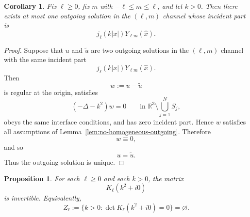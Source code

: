 \documentclass[a4paper,11pt]{article}
\numberwithin{equation}{section}
\newcommand{\R}{\mathbb{R}}
\newcommand{\jj}[1]{j_{#1}}
\newtheorem{cor}[thm]{Corollary}
\newtheorem{prop}[thm]{Proposition}
\theoremstyle{definition}
\theoremstyle{remark}
\begin{document}
\begin{cor}
\label{cor:partial-wave-uniqueness}
Fix $\ell\ge0$, fix $m$ with $-\ell\le m\le\ell$, and let $k>0$.
Then there exists at most one outgoing solution in the $(\ell,m)$ channel
whose incident part is
\[
\jj{\ell}(k|x|)Y_{\ell m}(\widehat x).
\]
\end{cor}

\begin{proof}
Suppose that $u$ and $\widetilde u$ are two outgoing solutions in the
$(\ell,m)$ channel with the same incident part
\[
\jj{\ell}(k|x|)Y_{\ell m}(\widehat x).
\]
Then
\[
w:=u-\widetilde u
\]
is regular at the origin, satisfies
\[
(-\Delta-k^2)w=0
\qquad \text{in }\R^3\setminus\bigcup_{j=1}^N S_j,
\]
obeys the same interface conditions, and has zero incident part.
Hence $w$ satisfies all assumptions of
Lemma~\ref{lem:no-homogeneous-outgoing}. Therefore
\[
w\equiv0,
\]
and so
\[
u=\widetilde u.
\]
Thus the outgoing solution is unique.
\end{proof}
\begin{prop}
\label{prop:Kell-invertible-positive}
For each $\ell\ge0$ and each $k>0$, the matrix
\[
K_\ell(k^2+i0)
\]
is invertible. Equivalently,
\[
Z_\ell
:=
\{k>0:\det K_\ell(k^2+i0)=0\}
=
\varnothing.
\]
\end{prop}
\end{document}
